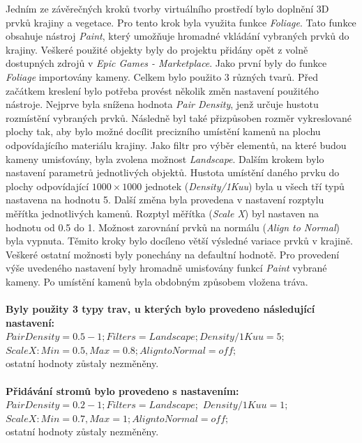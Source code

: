 \documentclass[a4paper, 12pt]{report}
\begin{document}
\newpage
Jedním ze závěrečných kroků tvorby virtuálního prostředí bylo doplnění 3D prvků krajiny a vegetace. Pro tento krok byla využita funkce \textit{Foliage}. Tato funkce obsahuje nástroj \textit{Paint}, který umožňuje hromadné vkládání vybraných prvků do krajiny. Veškeré použité objekty byly do projektu přidány opět z volně dostupných zdrojů v \textit{Epic Games - Marketplace}. Jako první byly do funkce \textit{Foliage} importovány kameny. Celkem bylo použito 3 různých tvarů. Před začátkem kreslení bylo potřeba provést několik změn nastavení použitého nástroje. Nejprve byla snížena hodnota \textit{Pair Density}, jenž určuje hustotu rozmístění vybraných prvků. Následně byl také přizpůsoben rozměr vykreslované plochy tak, aby bylo možné docílit precizního umístění kamenů na plochu odpovídajícího materiálu krajiny. Jako filtr pro výběr elementů, na které budou kameny umisťovány, byla zvolena možnost \textit{Landscape}. Dalším krokem bylo nastavení parametrů jednotlivých objektů. Hustota umístění daného prvku do plochy odpovídající $1000 \times 1000$ jednotek (\textit{Density/1Kuu}) byla u všech tří typů nastavena na hodnotu 5. Další změna byla provedena v nastavení rozptylu měřítka jednotlivých kamenů. Rozptyl měřítka (\textit{Scale X}) byl nastaven na hodnotu od 0.5 do 1. Možnost zarovnání prvků na normálu (\textit{Align to Normal}) byla vypnuta. Těmito kroky bylo docíleno větší výsledné variace prvků v krajině. Veškeré ostatní možnosti byly ponechány na defaultní hodnotě. Pro provedení výše uvedeného nastavení byly hromadně umisťovány funkcí \textit{Paint} vybrané kameny. Po umístění kamenů byla obdobným způsobem vložena tráva.\\
\\
\textbf{Byly použity 3 typy trav, u kterých bylo provedeno následující nastavení:}\\
$Pair Density = 0.5 - 1; Filters = Landscape; Density/1Kuu = 5;$\\
$ Scale X: Min = 0.5, Max = 0.8; Align to Normal = off;$\\
ostatní hodnoty zůstaly nezměněny. \\
\\
\textbf{Přidávání stromů bylo provedeno s nastavením:} \\
$Pair Density = 0.2 - 1; Filters = Landscape;$ $Density/1Kuu = 1;$\\$
Scale X: Min = 0.7, Max = 1; Align to Normal = off;$\\
ostatní hodnoty zůstaly nezměněny. \\
\\
\end{document}

